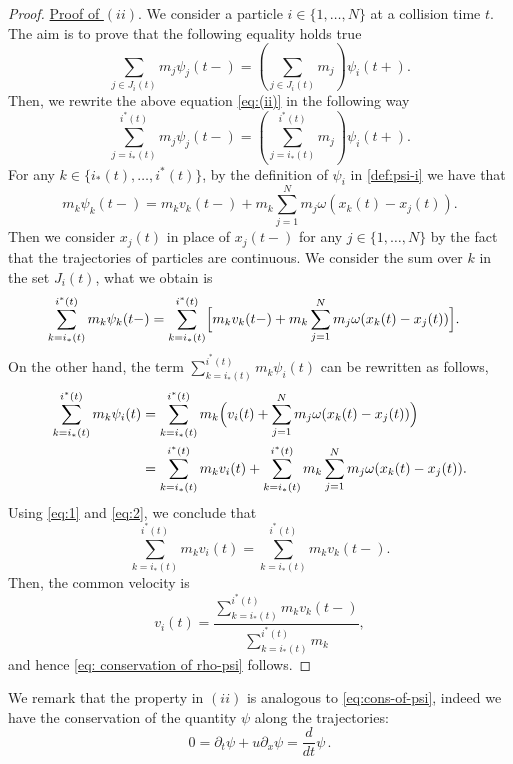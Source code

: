 \documentclass[11pt,a4paper,oneside]{amsart}
\begin{document}
\begin{proof}
    \underline{Proof of $(ii)$}. We consider a particle $i\in\{1,\ldots,N\}$ at a collision  time $t$. 
    The aim is to prove that the following equality holds true
    \begin{equation}\label{eq:(ii)}
        \sum_{j\in J_i(t)}m_j\psi_j(t-)=\left(\sum_{j\in J_i(t)}m_j \right) \psi_i(t+).
    \end{equation}
Then, we rewrite the above equation \eqref{eq:(ii)} in the following way
\begin{equation*}
    \sum_{j=i_*(t)}^{i^*(t)}m_j\psi_j(t-)=\left(\sum_{j=i_*(t)}^{i^*(t)}m_j \right)\psi_i(t+).
\end{equation*}
    For any $k\in\{i_*(t),\dots,i^*(t)\}$, by the definition of $\psi_i$ in \eqref{def:psi-i} we have that
    \begin{equation}\label{eq:sum-barycentric}
        m_k\psi_k(t-)=m_kv_k(t-)+m_k\sum_{j=1}^N m_j\omega(x_k(t)-x_j(t)).
    \end{equation}
  Then we consider $x_j(t)$ in place of $x_j(t-)$ for any $j\in\{1,\dots,N\}$ by the fact that the trajectories of particles are continuous.
    We consider the sum over $k$ in the set $J_i(t)$, what we obtain is
    \begin{align}\label{eq:1}
        &\sum_{k=i_*(t)}^{i^*(t)}m_k\psi_k(t-)=\sum_{k=i_*(t)}^{i^*(t)}\Bigr[m_kv_k(t-)+m_k\sum_{j=1}^N m_j\omega(x_k(t)-x_j(t))\Bigl].
    \end{align}
    On the other hand, the term $\displaystyle{\sum_{k=i_*(t)}^{i^*(t)}}m_k\psi_i(t)$ can be rewritten as follows,
    \begin{align}
        \notag
        \sum_{k=i_*(t)}^{i^*(t)}m_k\psi_i(t)&=\sum_{k=i_*(t)}^{i^*(t)}m_k\Bigr( v_i(t)+\sum_{j=1}^N m_j\omega(x_k(t)-x_j(t))\Bigl)\\
        \label{eq:2}
        &=\sum_{k=i_*(t)}^{i^*(t)}m_kv_i(t)+\sum_{k=i_*(t)}^{i^*(t)}m_k\sum_{j=1}^N m_j\omega(x_k(t)-x_j(t)).
    \end{align}
    Using \eqref{eq:1} and  \eqref{eq:2}, we conclude that  
    \begin{equation*}
        \sum_{k=i_*(t)}^{i^*(t)}m_kv_i(t)=\sum_{k=i_*(t)}^{i^*(t)} m_kv_k(t-).
    \end{equation*}
    Then, the common velocity is
    \begin{equation*}
        v_i(t)=\frac{\sum_{k=i_*(t)}^{i^*(t)}m_kv_k(t-)}{\sum_{k=i_*(t)}^{i^*(t)}m_k},
    \end{equation*}
    and hence \eqref{eq: conservation of rho-psi} follows.
\end{proof}
%
We remark that the property in ${(ii)}$ is analogous to \eqref{eq:cons-of-psi}, 
indeed we have the conservation of the quantity $\psi$ along the trajectories:
\begin{equation*}
    0=\partial_t\psi+u\partial_x\psi=\frac{d}{dt}\psi\,.
\end{equation*}
\end{document}
